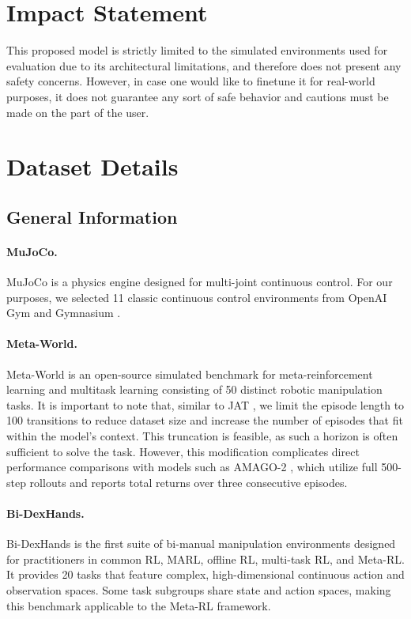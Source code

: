 \documentclass{article}
\theoremstyle{plain}
\theoremstyle{definition}
\theoremstyle{remark}
\begin{document}
\section*{Impact Statement}
This proposed model is strictly limited to the simulated environments used for evaluation due to its architectural limitations, and therefore does not present any safety concerns. However, in case one would like to finetune it for real-world purposes, it does not guarantee any sort of safe behavior and cautions must be made on the part of the user.


\newpage
\appendix
\onecolumn
\section{Dataset Details}\label{appendix:dataset}
\subsection{General Information}\label{appendix:dataset:general-info}
\paragraph{MuJoCo.} MuJoCo \cite{6386109} is a physics engine designed for multi-joint continuous control. For our purposes, we selected 11 classic continuous control environments from OpenAI Gym \cite{brockman2016openaigym} and Gymnasium \cite{towers2024gymnasiumstandardinterfacereinforcement}.
\paragraph{Meta-World.} Meta-World \cite{yu2021metaworldbenchmarkevaluationmultitask} is an open-source simulated benchmark for meta-reinforcement learning and multitask learning consisting of 50 distinct robotic manipulation tasks. It is important to note that, similar to JAT \cite{gallouédec2024jacktradesmastersome}, we limit the episode length to 100 transitions to reduce dataset size and increase the number of episodes that fit within the model's context. This truncation is feasible, as such a horizon is often sufficient to solve the task. However, this modification complicates direct performance comparisons with models such as AMAGO-2 \cite{grigsby2024amago2breakingmultitaskbarrier}, which utilize full 500-step rollouts and reports total returns over three consecutive episodes.
\paragraph{Bi-DexHands.} Bi-DexHands \cite{chen2022humanlevelbimanualdexterousmanipulation} is the first suite of bi-manual manipulation environments designed for practitioners in common RL, MARL, offline RL, multi-task RL, and Meta-RL. It provides 20 tasks that feature complex, high-dimensional continuous action and observation spaces. Some task subgroups share state and action spaces, making this benchmark applicable to the Meta-RL framework.
\end{document}
